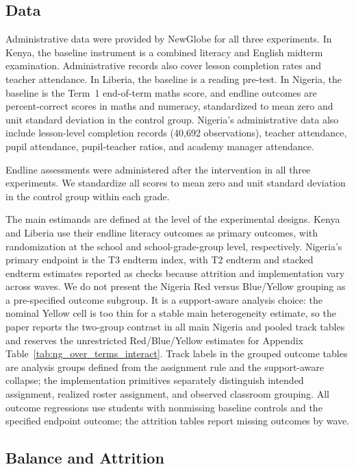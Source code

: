 \documentclass[11pt]{article}
\begin{document}
\subsection{Data}

Administrative data were provided by NewGlobe for all three experiments. In Kenya, the baseline instrument is a combined literacy and English midterm examination. Administrative records also cover lesson completion rates and teacher attendance. In Liberia, the baseline is a reading pre-test. In Nigeria, the baseline is the Term~1 end-of-term maths score, and endline outcomes are percent-correct scores in maths and numeracy, standardized to mean zero and unit standard deviation in the control group. Nigeria's administrative data also include lesson-level completion records (40,692 observations), teacher attendance, pupil attendance, pupil-teacher ratios, and academy manager attendance.

Endline assessments were administered after the intervention in all three experiments. We standardize all scores to mean zero and unit standard deviation in the control group within each grade.

The main estimands are defined at the level of the experimental designs. Kenya and Liberia use their endline literacy outcomes as primary outcomes, with randomization at the school and school-grade-group level, respectively. Nigeria's primary endpoint is the T3 endterm index, with T2 endterm and stacked endterm estimates reported as checks because attrition and implementation vary across waves. We do not present the Nigeria Red versus Blue/Yellow grouping as a pre-specified outcome subgroup. It is a support-aware analysis choice: the nominal Yellow cell is too thin for a stable main heterogeneity estimate, so the paper reports the two-group contrast in all main Nigeria and pooled track tables and reserves the unrestricted Red/Blue/Yellow estimates for Appendix Table~\ref{tab:ng_over_terms_interact}. Track labels in the grouped outcome tables are analysis groups defined from the assignment rule and the support-aware collapse; the implementation primitives separately distinguish intended assignment, realized roster assignment, and observed classroom grouping. All outcome regressions use students with nonmissing baseline controls and the specified endpoint outcome; the attrition tables report missing outcomes by wave.

\subsection{Balance and Attrition}
\end{document}
